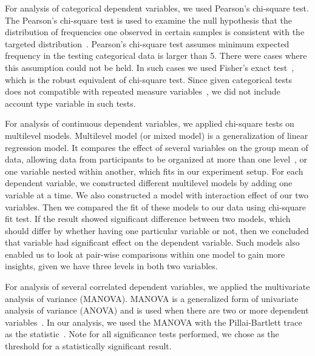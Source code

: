 \documentclass[conference]{IEEEtran}
\begin{document}
For analysis of categorical dependent variables, we used Pearson's chi-square test. The Pearson's chi-square test is used to examine the null hypothesis that the distribution of frequencies one observed in certain samples is consistent with the targeted distribution~\cite{doi:10.1080/14786440009463897}. 
Pearson's chi-square test assumes minimum expected frequency in the testing categorical data is larger than 5.
There were cases where this assumption could not be held. In such cases we used Fisher's exact test~\cite{doi:10.2307/2340521}, which is the robust equivalent of chi-square test. Since given categorical tests does not compatible with repeated measure variables~\cite{isbn:9781446200469}, we did not include account type variable in such tests.

For analysis of continuous dependent variables, we applied chi-square tests on multilevel models. Multilevel model (or mixed model) is a generalization of linear regression model. It compares the effect of several variables on the group mean of data, allowing data from participants to be organized at more than one level~\cite{barbarataba2007}, or one variable nested within another, which fits in our experiment setup. For each dependent variable, we constructed different multilevel models by adding one variable at a time. We also constructed a model with interaction effect of our two variables. Then we compared the fit of these models to our data using chi-square fit test. If the result showed significant difference between two models, which should differ by whether having one particular variable or not, then we concluded that variable had significant effect on the dependent variable. Such models also enabled us to look at pair-wise comparisons within one model to gain more insights, given we have three levels in both two variables.

For analysis of several correlated dependent variables, we applied the multivariate analysis of variance (MANOVA). MANOVA is a generalized form of univariate analysis of variance (ANOVA) and is used when there are two or more dependent variables~\cite{Stevens:1986:AMS:21800}. In our analysis, we used the MANOVA with the Pillai-Bartlett trace as the statistic~\cite{isbn:9781446200469}.
Note for all significance tests performed, we chose  as the threshold for a statistically significant result.





 
\let\oldtabular\tabular
\renewcommand{\tabular}{\small\oldtabular}
\end{document}
